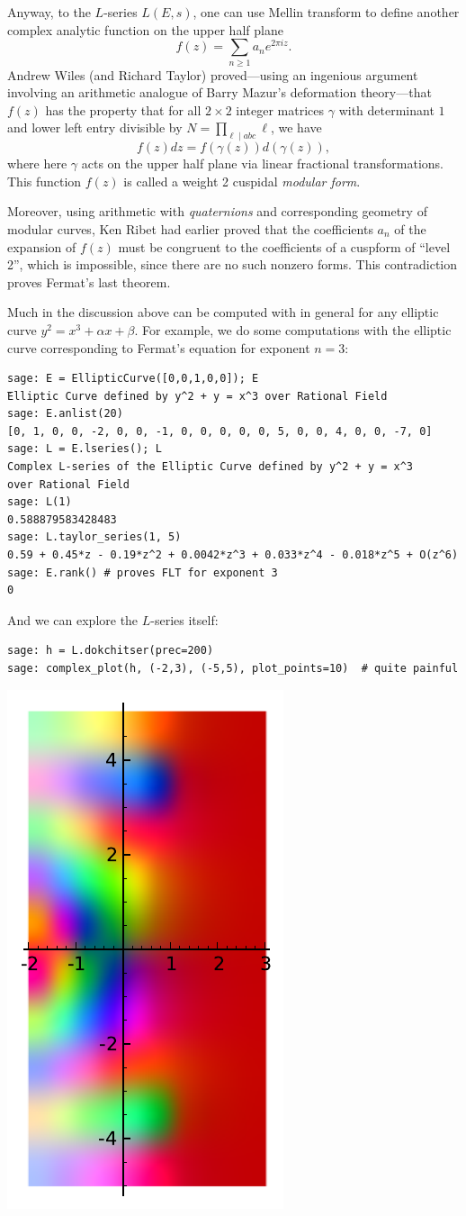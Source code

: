 \documentclass{book}
\begin{document}
Anyway, to the $L$-series $L(E,s)$, one can use
Mellin transform to define another complex analytic function
on the upper half plane
$$
f(z) = \sum_{n\geq 1} a_n e^{2\pi i z}.
$$
Andrew Wiles (and Richard Taylor) proved---using an ingenious
argument involving an arithmetic analogue of Barry Mazur's
deformation theory---that
$f(z)$ has the property that for
all $2\times 2$ integer matrices
$\gamma$ with determinant $1$ and lower left entry divisible
by $N=\prod_{\ell\mid abc} \ell$, we have
$$
  f(z) dz = f(\gamma(z)) d(\gamma(z)),
$$
where here $\gamma$ acts on the upper half plane
via linear fractional transformations.  This function
$f(z)$ is called a weight 2 cuspidal {\em modular form}.

Moreover, using arithmetic with {\em quaternions} and corresponding
geometry of modular curves, Ken Ribet had earlier proved that
the coefficients $a_n$ of the expansion of
$f(z)$ must be congruent to the coefficients
of a cuspform of ``level 2'', which is
impossible, since there are no such nonzero forms.
This contradiction proves Fermat's last theorem.

Much in the discussion above can be computed with
in general for any elliptic curve $y^2=x^3 + \alpha x + \beta$.
For example, we do some computations with the elliptic
curve corresponding to Fermat's equation for exponent $n=3$:
\begin{lstlisting}
sage: E = EllipticCurve([0,0,1,0,0]); E
︡Elliptic Curve defined by y^2 + y = x^3 over Rational Field
sage: E.anlist(20)
[0, 1, 0, 0, -2, 0, 0, -1, 0, 0, 0, 0, 0, 5, 0, 0, 4, 0, 0, -7, 0]
sage: L = E.lseries(); L
Complex L-series of the Elliptic Curve defined by y^2 + y = x^3
over Rational Field
sage: L(1)
0.588879583428483
sage: L.taylor_series(1, 5)
0.59 + 0.45*z - 0.19*z^2 + 0.0042*z^3 + 0.033*z^4 - 0.018*z^5 + O(z^6)
sage: E.rank() # proves FLT for exponent 3
0
\end{lstlisting}
And we can explore the $L$-series itself:
\begin{lstlisting}
sage: h = L.dokchitser(prec=200)
sage: complex_plot(h, (-2,3), (-5,5), plot_points=10)  # quite painful
\end{lstlisting}

\begin{center}
\includegraphics[width=.4\textwidth]{pics/27a-lser1.pdf}
\end{center}
\end{document}
